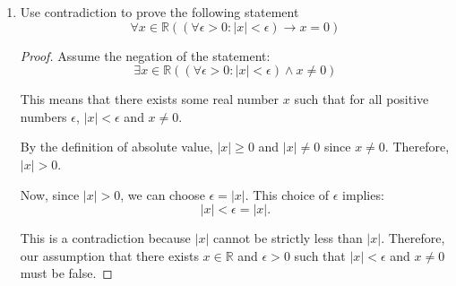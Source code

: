 \documentclass[12pt]{article}
\newcommand{\paren}[1]{\left( #1 \right)}
\begin{document}
\begin{enumerate}
\begin{enumerate}
\begin{proof}
                Substitute these into the expression $m - n$:
                \[
                m - n = (dq_m + r_m) - (dq_n + r_n) = d(q_m - q_n) + (r_m - r_n).
                \]
                notice that $q = q_m - q_n$, and $\paren{r_m - r_n} = 0$, therefore we can make the following conclusion
                \[
                r_m = r_n
                \]
                and $m \bmod d$ and $n \bmod d$ would have the same remainder. 
                

                \end{proof}


                    
        \end{enumerate}
\newpage
    \item Use contradiction to prove the following statement
        \[
        \forall x \in \mathbb{R} \left( \left( \forall \epsilon > 0 : |x| < \epsilon \right) \rightarrow x = 0 \right)
        \]
        
        \begin{proof}
        Assume the negation of the statement:
        \[
        \exists x \in \mathbb{R} \left( \left( \forall \epsilon > 0 : |x| < \epsilon \right) \wedge x \neq 0 \right)
        \]
        
        This means that there exists some real number \( x \) such that for all positive numbers \( \epsilon \), \( |x| < \epsilon \) and \( x \neq 0 \).
        
        By the definition of absolute value, \( |x| \geq 0 \) and \( |x| \neq 0 \) since \( x \neq 0 \). Therefore, \( |x| > 0 \).
        
        Now, since \( |x| > 0 \), we can choose \( \epsilon = |x| \). This choice of \( \epsilon \) implies:
        \[
        |x| < \epsilon = |x|.
        \]
        
        This is a contradiction because \( |x| \) cannot be strictly less than \( |x| \). Therefore, our assumption that there exists \( x \in \mathbb{R} \) and \( \epsilon > 0 \) such that \( |x| < \epsilon \) and \( x \neq 0 \) must be false.
        

\end{proof}
\end{enumerate}
\end{document}
